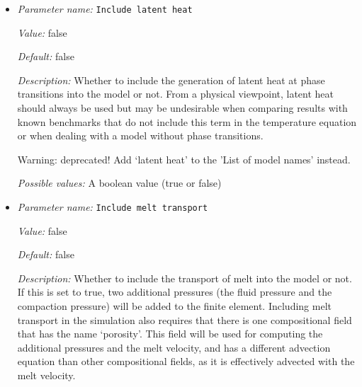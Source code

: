\begin{itemize}
{\it Value:} false


{\it Default:} false


{\it Description:} Whether to include adiabatic heating into the model or not. From a physical viewpoint, adiabatic heating should always be used but may be undesirable when comparing results with known benchmarks that do not include this term in the temperature equation.

Warning: deprecated! Add `adiabatic heating' to the 'List of model names' instead.


{\it Possible values:} A boolean value (true or false)
\item {\it Parameter name:} {\tt Include latent heat}
\label{parameters:Model settings/Include latent heat}


{\it Value:} false


{\it Default:} false


{\it Description:} Whether to include the generation of latent heat at phase transitions into the model or not. From a physical viewpoint, latent heat should always be used but may be undesirable when comparing results with known benchmarks that do not include this term in the temperature equation or when dealing with a model without phase transitions.

Warning: deprecated! Add `latent heat' to the 'List of model names' instead.


{\it Possible values:} A boolean value (true or false)
\item {\it Parameter name:} {\tt Include melt transport}
\label{parameters:Model settings/Include melt transport}


{\it Value:} false


{\it Default:} false


{\it Description:} Whether to include the transport of melt into the model or not. If this is set to true, two additional pressures (the fluid pressure and the compaction pressure) will be added to the finite element. Including melt transport in the simulation also requires that there is one compositional field that has the name `porosity'. This field will be used for computing the additional pressures and the melt velocity, and has a different advection equation than other compositional fields, as it is effectively advected with the melt velocity.



\end{itemize}
